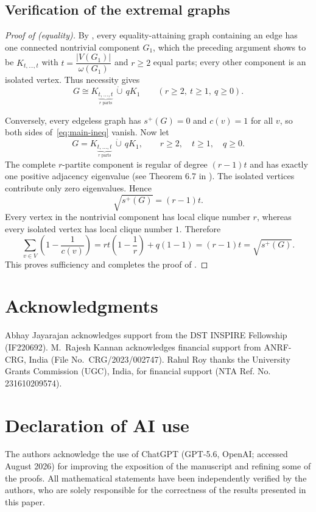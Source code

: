 \documentclass[11pt]{article}
\numberwithin{equation}{section}
\theoremstyle{definition}
\theoremstyle{remark}
\newcommand{\splus}{s^{+}}
\begin{document}
	\subsection{Verification of the extremal graphs}
	
	\begin{proof}[Proof of  (equality)]
		By , every equality-attaining graph containing an edge has one
		connected nontrivial component $G_1$, which the preceding argument shows to be
		$K_{t,\ldots,t}$ with $t=\dfrac{\vert V(G_1) \vert}{\omega(G_1)}$ and $r\geq2$ equal parts; every other component is an
		isolated vertex.  Thus necessity gives
		\[
		G\cong K_{\underbrace{t,\ldots,t}_{r\text{ parts}}}\,\dot\cup\,qK_1
		\qquad(r\geq2,\ t\geq1,\ q\geq0).
		\]
		
		Conversely, every edgeless graph has $\splus(G)=0$ and $c(v)=1$ for
		all $v$, so both sides of~\eqref{eq:main-ineq} vanish.  Now let
		\[
		G=K_{\underbrace{t,\ldots,t}_{r\text{ parts}}}\,\dot\cup\,qK_1,
		\qquad r\geq2,\quad t\geq1,\quad q\geq0.
		\]
		The complete $r$-partite component is regular of degree
		$(r-1)t$ and has exactly one positive adjacency eigenvalue (see Theorem 6.7 in \cite{MR572262}).  The isolated vertices
		contribute only zero eigenvalues.  Hence
		\[
		\sqrt{\splus(G)}=(r-1)t.
		\]
		Every vertex in the nontrivial component has local clique number $r$,
		whereas every isolated vertex has local clique number $1$.  Therefore
		\[
		\sum_{v\in V}\left(1-\frac1{c(v)}\right)
		=rt\left(1-\frac1r\right)+q(1-1)
		=(r-1)t
		=\sqrt{\splus(G)}.
		\]
		This proves sufficiency and completes the proof of .
	\end{proof}
	
	
	\section*{Acknowledgments}
	Abhay Jayarajan acknowledges support from the DST INSPIRE Fellowship (IF220692). M.~Rajesh Kannan acknowledges financial support from ANRF-CRG, India (File No.\ CRG/2023/002747). Rahul Roy thanks the University Grants Commission (UGC), India, for financial support (NTA Ref. No. 231610209574).
	
	
	\section*{Declaration of AI use}
	The authors acknowledge the use of ChatGPT (GPT-5.6, OpenAI; accessed August 2026) for improving the exposition of the manuscript and refining some of the proofs. All mathematical statements have been independently verified by the authors, who are solely responsible for the correctness of the results presented in this paper.
	
\end{document}

